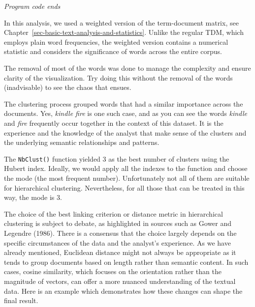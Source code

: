\emph{Program code ends}

In this analysis, we used a weighted version of the term-document
matrix, see Chapter~\ref{sec-basic-text-analysis-and-statistics}. Unlike
the regular TDM, which employs plain word frequencies, the weighted
version contains a numerical statistic and considers the significance of
words across the entire corpus.

The removal of most of the words was done to manage the complexity and
ensure clarity of the visualization. Try doing this without the removal
of the words (inadvisable) to see the chaos that ensues.

The clustering process grouped words that had a similar
importance across the documents. Yes, \emph{kindle fire} is one such case,
and as you can see the words \emph{kindle} and \textit{fire} frequently occur together
in the context of this dataset. It is the experience and the knowledge
of the analyst that make sense of the clusters and the underlying semantic
relationships and patterns.

The \texttt{NbClust()} function yielded 3 as the best number of clusters
using the Hubert index. Ideally, we would apply all the indexes to the
function and choose the mode (the most frequent number). Unfortunately
not all of them are suitable for hierarchical clustering.
Nevertheless, for all those that can be treated in this way, the mode is 3.

The choice of the best linking criterion or distance metric in
hierarchical clustering is subject to debate, as highlighted in sources
such as Gower and Legendre (1986). There is a consensus that the choice
largely depends on the specific circumstances of the data and the
analyst's experience. As we have already mentioned, Euclidean
distance might not always be appropriate as it tends to group documents
based on length rather than semantic content. In such cases, cosine
similarity, which focuses on the orientation rather than the magnitude
of vectors, can offer a more nuanced understanding of the textual data.
Here is an example which demonstrates how these changes can shape the final
result.

